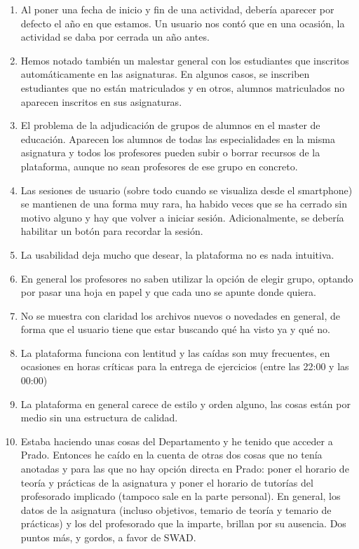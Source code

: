 \begin{enumerate}
\item Al poner una fecha de inicio y fin de una actividad, debería aparecer por defecto el año en que estamos. Un usuario nos contó que en una ocasión, la actividad se daba por cerrada un año antes.

\item Hemos notado también un malestar general con los estudiantes que inscritos automáticamente en las asignaturas. En algunos casos, se inscriben estudiantes que no están matriculados y en otros, alumnos matriculados no aparecen inscritos en sus asignaturas.

\item El problema de la adjudicación de grupos de alumnos en el master de educación. Aparecen los alumnos de todas las especialidades en la misma asignatura y todos los profesores pueden subir o borrar recursos de la plataforma, aunque no sean profesores de ese grupo en concreto.


\item Las sesiones de usuario (sobre todo cuando se visualiza desde el smartphone) se mantienen de una forma muy rara, ha habido veces que se ha cerrado sin motivo alguno y hay que volver a iniciar sesión. Adicionalmente, se debería habilitar un botón para recordar la sesión.

\item La usabilidad deja mucho que desear, la plataforma no es nada intuitiva.

\item En general los profesores no saben utilizar la opción de elegir grupo, optando por pasar una hoja en papel y que cada uno se apunte donde quiera.

\item No se muestra con claridad los archivos nuevos o novedades en general, de forma que el usuario tiene que estar buscando qué ha visto ya y qué no.

\item La plataforma funciona con lentitud y las caídas son muy frecuentes, en ocasiones en horas críticas para la entrega de ejercicios (entre las 22:00 y las 00:00)

\item La plataforma en general carece de estilo y orden alguno, las cosas están por medio sin una estructura de calidad.

\item Estaba haciendo unas cosas del Departamento y he tenido que acceder a Prado. Entonces he caído en la cuenta de otras dos cosas que no tenía anotadas y para las que no hay opción directa en Prado: poner el horario de teoría y prácticas de la asignatura y poner el horario de tutorías del profesorado implicado (tampoco sale en la parte personal). En general, los datos de la asignatura (incluso objetivos, temario de teoría y temario de prácticas) y los del profesorado que la imparte, brillan por su ausencia. Dos puntos más, y gordos, a favor de SWAD.


\end{enumerate}
